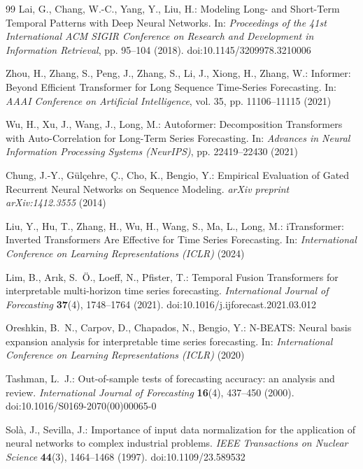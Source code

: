 \documentclass[pdflatex,sn-mathphys-num]{sn-jnl}
\theoremstyle{thmstyleone}
\theoremstyle{thmstyletwo}
\theoremstyle{thmstylethree}
\begin{document}
\begin{thebibliography}{99}
Lai, G., Chang, W.-C., Yang, Y., Liu, H.: Modeling Long- and Short-Term Temporal Patterns with Deep Neural Networks. In: \textit{Proceedings of the 41st International ACM SIGIR Conference on Research and Development in Information Retrieval}, pp. 95--104 (2018). doi:10.1145/3209978.3210006

Zhou, H., Zhang, S., Peng, J., Zhang, S., Li, J., Xiong, H., Zhang, W.: Informer: Beyond Efficient Transformer for Long Sequence Time-Series Forecasting. In: \textit{AAAI Conference on Artificial Intelligence}, vol. 35, pp. 11106--11115 (2021)

Wu, H., Xu, J., Wang, J., Long, M.: Autoformer: Decomposition Transformers with Auto-Correlation for Long-Term Series Forecasting. In: \textit{Advances in Neural Information Processing Systems (NeurIPS)}, pp. 22419--22430 (2021)

Chung, J.-Y., G\"ul\c{c}ehre, {\c{C}}., Cho, K., Bengio, Y.: Empirical Evaluation of Gated Recurrent Neural Networks on Sequence Modeling. \textit{arXiv preprint arXiv:1412.3555} (2014)

Liu, Y., Hu, T., Zhang, H., Wu, H., Wang, S., Ma, L., Long, M.: iTransformer: Inverted Transformers Are Effective for Time Series Forecasting. In: \textit{International Conference on Learning Representations (ICLR)} (2024)

Lim, B., Ar{\i}k, S.~\"O., Loeff, N., Pfister, T.: Temporal Fusion Transformers for interpretable multi-horizon time series forecasting. \textit{International Journal of Forecasting} \textbf{37}(4), 1748--1764 (2021). doi:10.1016/j.ijforecast.2021.03.012

Oreshkin, B.~N., Carpov, D., Chapados, N., Bengio, Y.: N-BEATS: Neural basis expansion analysis for interpretable time series forecasting. In: \textit{International Conference on Learning Representations (ICLR)} (2020)

Tashman, L.~J.: Out-of-sample tests of forecasting accuracy: an analysis and review. \textit{International Journal of Forecasting} \textbf{16}(4), 437--450 (2000). doi:10.1016/S0169-2070(00)00065-0

Sol\`a, J., Sevilla, J.: Importance of input data normalization for the application of neural networks to complex industrial problems. \textit{IEEE Transactions on Nuclear Science} \textbf{44}(3), 1464--1468 (1997). doi:10.1109/23.589532


\end{thebibliography}
\end{document}
